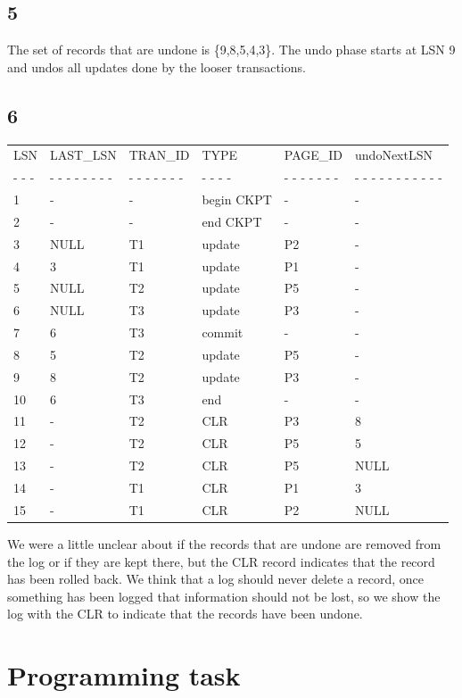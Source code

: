 \documentclass{article}
\theoremstyle{plain}
\theoremstyle{nonumberplain}
\begin{document}
\subsection*{5}
The set of records that are undone is \{9,8,5,4,3\}. The undo phase starts at LSN 9 and undos all updates done by the looser transactions. 

\subsection*{6}
\begin{tabular}{ l  l  l  l  l  l }
	LSN & LAST\_LSN & TRAN\_ID & TYPE & PAGE\_ID & undoNextLSN \\
	- - - & - - - - - - - - & - - - - - - - & - - - - & - - - - - - - & - - - - - - - - - - - \\
	1 & - & - & begin CKPT & - & - \\
	2 & - & - & end CKPT & - & - \\
	3 & NULL & T1 & update & P2 & - \\
	4 & 3 & T1 & update & P1 & - \\
	5 & NULL & T2 & update & P5 & - \\
	6 & NULL & T3 & update & P3 & - \\
	7 & 6 & T3 & commit & - & - \\
	8 & 5 & T2 & update & P5 & - \\
	9 & 8 & T2 & update & P3 & - \\
	10 & 6 & T3 & end & - & - \\
	11 & - & T2 & CLR & P3 & 8 \\
	12 & - & T2 & CLR & P5 & 5 \\
	13 & - & T2 & CLR & P5 & NULL \\
	14 & - & T1 & CLR & P1 & 3 \\
	15 & - & T1 & CLR & P2 & NULL \\
\end{tabular}
We were a little unclear about if the records that are undone are removed from the log or if they are kept there, but the CLR record indicates that the record has been rolled back. We think that a log should never delete a record, once something has been logged that information should not be lost, so we show the log with the CLR to indicate that the records have been undone.

\section{Programming task}
\end{document}
